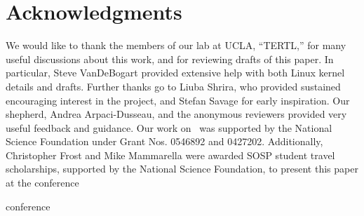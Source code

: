 \section*{Acknowledgments}

We would like to thank the members of our lab at UCLA, ``TERTL,'' for many
useful discussions about this work, and for reviewing drafts of this paper. In
particular, Steve VanDeBogart provided extensive help with both Linux
kernel details and drafts. Further thanks go to Liuba
Shrira, who provided sustained encouraging interest in the project, and
Stefan Savage for early inspiration.
Our shepherd, Andrea Arpaci-Dusseau, and the anonymous reviewers
provided very useful feedback and guidance.
%
Our work on \Kudos\ was supported by the National Science
 Foundation under Grant Nos. 0546892 and 0427202.
%
Additionally, Christopher Frost and Mike Mammarella were awarded SOSP student
travel scholarships, supported by the National Science Foundation, to present
this paper at the
\ifpdf
conference

\else
conference

\fi


